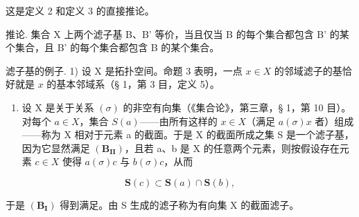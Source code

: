 这是定义 2 和定义 3 的直接推论。

推论. 集合 X 上两个滤子基 B、B' 等价，当且仅当 B 的每个集合都包含 B' 的某个集合，且 B' 的每个集合都包含 B 的某个集合。

滤子基的例子. 1) 设 X 是拓扑空间。命题 3 表明，一点 \(x \in X\) 的邻域滤子的基恰好就是 \(x\) 的基本邻域系（§ 1，第 3 目，定义 5）。

\begin{enumerate}
\def\labelenumi{\arabic{enumi})}
\setcounter{enumi}{1}
\tightlist
\item
  设 X 是关于关系 \((\sigma)\) 的非空有向集（《集合论》，第三章，§ 1，第 10 目）。对每个 \(a \in X\)，集合 \(S(a)\)——由所有这样的 \(x \in X\)（满足 \(a(\sigma)x\) 者）组成——称为 X 相对于元素 a 的截面。于是 X 的截面所成之集 S 是一个滤子基，因为它显然满足 \((\mathbf{B}_{\mathbf{II}})\)，且若 a、b 是 X 的任意两个元素，则按假设存在元素 \(c \in X\) 使得 \(a(\sigma)c\) 与 \(b(\sigma)c\)，从而
\end{enumerate}

\[
\mathbf {S} (c) \subset \mathbf {S} (a) \cap \mathbf {S} (b),
\]

于是 \((\mathbf{B}_{\mathbf{I}})\) 得到满足。由 S 生成的滤子称为有向集 X 的截面滤子。

